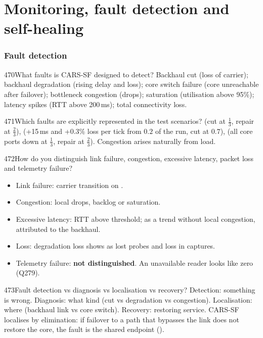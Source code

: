 \part{Monitoring, fault detection and self-healing}

\FigHeal

\section{Fault detection}

\begin{qa}{470}{What faults is CARS-SF designed to detect?}
Backhaul cut (loss of carrier); backhaul degradation (rising delay and loss); core switch failure (core unreachable
after failover); bottleneck congestion (drops); saturation (utilisation above 95\%); latency spikes (RTT above
200\,ms); total connectivity loss.
\end{qa}

\begin{qa}{471}{Which faults are explicitly represented in the test scenarios?}
 (cut at $\frac13$, repair at $\frac23$),  (+15\,ms and +0.3\% loss per
tick from $0.2$ of the run, cut at $0.7$),  (all core ports down at $\frac13$, repair at
$\frac23$). Congestion arises naturally from load.
\end{qa}

\begin{qa}{472}{How do you distinguish link failure, congestion, excessive latency, packet loss and telemetry failure?}
\begin{itemize}
\item Link failure: carrier transition on .
\item Congestion: local drops, backlog or saturation.
\item Excessive latency: RTT above threshold; as a trend without local congestion, attributed to the backhaul.
\item Loss: degradation loss shows as lost probes and loss in captures.
\item Telemetry failure: \textbf{not distinguished}. An unavailable reader looks like zero (Q279).
\end{itemize}
\end{qa}

\begin{qa}{473}{Fault detection vs diagnosis vs localisation vs recovery?}
Detection: something is wrong. Diagnosis: what kind (cut vs degradation vs congestion). Localisation: where (backhaul
link vs core switch). Recovery: restoring service. CARS-SF localises by elimination: if failover to a path that
bypasses the link does not restore the core, the fault is the shared endpoint ().
\end{qa}

